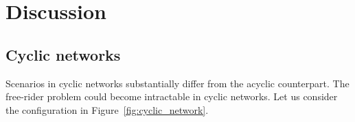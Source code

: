 \documentclass[12pt,letter]{article}
\theoremstyle{definition}
\theoremstyle{remark}
\theoremstyle{claim}
\begin{document}
\section{Discussion}
\label{sec:varies}
%
%


%
%
%
%
%
%
\subsection{Cyclic networks}
\label{sec:cyclic}


Scenarios in cyclic networks substantially differ from the acyclic counterpart. The free-rider problem could become intractable in cyclic networks. Let us consider the configuration in Figure~\ref{fig:cyclic_network}.
\end{document}
